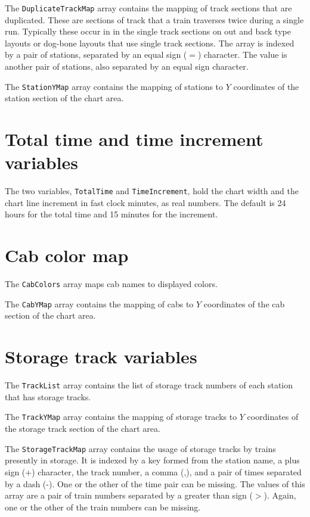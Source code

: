 The {\tt DuplicateTrackMap} array contains the mapping of track sections
that are duplicated.  These are sections of track that a train traverses
twice during a single run.  Typically these occur in in the single track
sections on out and back type layouts or dog-bone layouts that use
single track sections.  The array is indexed by a pair of stations,
separated by an equal sign ($=$) character.  The value is another pair
of stations, also separated by an equal sign character.

The {\tt StationYMap} array contains the mapping of stations to $Y$
coordinates of the station section of the chart area.

\section{Total time and time increment variables}

The two variables, {\tt TotalTime} and {\tt TimeIncrement}, hold the
chart width and the chart line increment in fast clock minutes, as real
numbers.  The default is 24 hours for the total time and 15 minutes for
the increment.

\section{Cab color map}

The {\tt CabColors} array maps cab names to displayed
colors.


The {\tt CabYMap} array contains the mapping of
cabs to $Y$ coordinates of the cab section of the chart area.

\section{Storage track variables}

The {\tt TrackList} array contains the list of
storage track numbers of each station that has storage tracks.

The {\tt TrackYMap} array contains the mapping
of storage tracks to $Y$ coordinates of the storage track section of
the chart area.

The {\tt StorageTrackMap} array contains the usage of storage tracks by
trains presently in storage.  It is indexed by a key formed from the
station name, a plus sign ($+$) character, the track number, a comma
(,), and a pair of times separated by a dash (-). One or the other of
the time pair can be missing.  The values of this array are a pair of
train numbers separated by a greater than sign ($>$).  Again, one or the
other of the train numbers can be missing.

